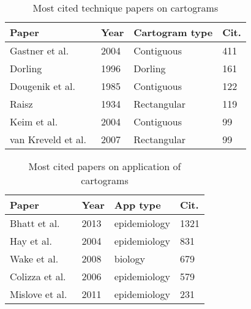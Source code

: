 \documentclass{egpubl}
\begin{document}
\begin{table}[h]
\caption{Most cited technique papers on cartograms} \centering \begin{tabular}{ l   l   l  l } \hline\hline Paper & Year & Cartogram type & Cit. \\ [0.5ex] \hline 

Gastner et al.~\cite{GN04} & 2004 & Contiguous & 411\\ [1ex] 
Dorling~\cite{dorling96} & 1996 & Dorling  & 161\\ [1ex] 

Dougenik et al.~\cite{DCN85} & 1985 & Contiguous & 122\\ [1ex] 

Raisz~\cite{Raisz34} & 1934 & Rectangular & 119\\[1ex] 

Keim et al.~\cite{KNP04} &  2004 & Contiguous & 99\\[1ex] 

van Kreveld et al.~\cite{ks07} & 2007 & Rectangular & 99\\[1ex] 

\hline \end{tabular}
\label{table:tech_papers} \vspace{-0.2cm}
\end{table}


\begin{table}[h]
\caption{Most cited papers on application of cartograms} \centering \begin{tabular}{ l   l  l l } \hline\hline Paper & Year & App type & Cit. \\ [0.5ex] \hline 

Bhatt et al.~\cite{bhatt2013global} & 2013  & epidemiology &1321\\ [1ex] 

Hay et al.~\cite{hay2004global} & 2004 &  epidemiology & 831\\[1ex] 

Wake et al.~\cite{wake2008we} & 2008 &  biology & 679\\ [1ex] 

Colizza et al.~\cite{colizza2006role} & 2006 & epidemiology & 579\\[1ex]

Mislove et al.~\cite{mislove2011understanding} & 2011 & epidemiology & 231\\ [1ex] 


\hline \end{tabular}
\label{table:app_papers} \vspace{-0.2cm}
\end{table}
\end{document}
